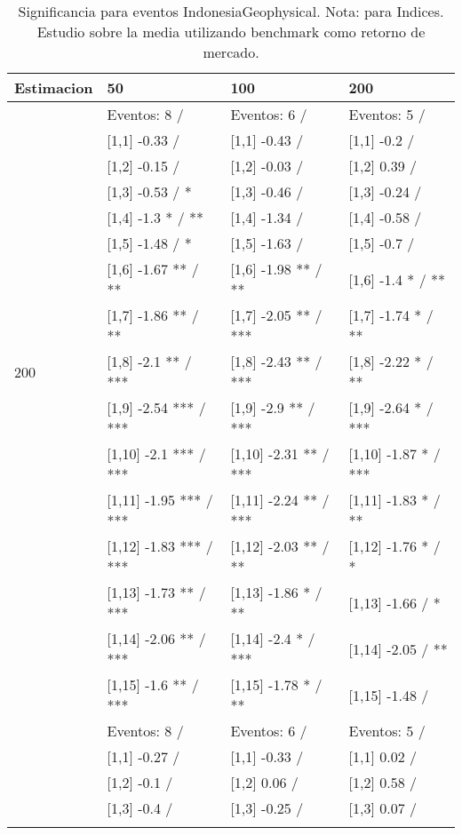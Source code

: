 \begin{table}

\caption{Significancia para eventos IndonesiaGeophysical. Nota: para Indices. Estudio sobre la media utilizando benchmark como retorno de mercado.}
\centering
\begin{tabular}[t]{llll}
\toprule
Estimacion & 50 & 100 & 200\\
\midrule
 & Eventos:  8 / & Eventos:  6 / & Eventos:  5 /\\
 & {}[1,1] -0.33  / & {}[1,1] -0.43  / & {}[1,1] -0.2  /\\
 & {}[1,2] -0.15  / & {}[1,2] -0.03  / & {}[1,2] 0.39  /\\
 & {}[1,3] -0.53  / * & {}[1,3] -0.46  / & {}[1,3] -0.24  /\\
 & {}[1,4] -1.3 * / ** & {}[1,4] -1.34  / & {}[1,4] -0.58  /\\
\addlinespace
 & {}[1,5] -1.48  / * & {}[1,5] -1.63  / & {}[1,5] -0.7  /\\
 & {}[1,6] -1.67 ** / ** & {}[1,6] -1.98 ** / ** & {}[1,6] -1.4 * / **\\
 & {}[1,7] -1.86 ** / ** & {}[1,7] -2.05 ** / *** & {}[1,7] -1.74 * / **\\
200 & {}[1,8] -2.1 ** / *** & {}[1,8] -2.43 ** / *** & {}[1,8] -2.22 * / **\\
 & {}[1,9] -2.54 *** / *** & {}[1,9] -2.9 ** / *** & {}[1,9] -2.64 * / ***\\
\addlinespace
 & {}[1,10] -2.1 *** / *** & {}[1,10] -2.31 ** / *** & {}[1,10] -1.87 * / ***\\
 & {}[1,11] -1.95 *** / *** & {}[1,11] -2.24 ** / *** & {}[1,11] -1.83 * / **\\
 & {}[1,12] -1.83 *** / *** & {}[1,12] -2.03 ** / ** & {}[1,12] -1.76 * / *\\
 & {}[1,13] -1.73 ** / *** & {}[1,13] -1.86 * / ** & {}[1,13] -1.66  / *\\
 & {}[1,14] -2.06 ** / *** & {}[1,14] -2.4 * / *** & {}[1,14] -2.05  / **\\
\addlinespace
 & {}[1,15] -1.6 ** / *** & {}[1,15] -1.78 * / ** & {}[1,15] -1.48  /\\
 & Eventos:  8 / & Eventos:  6 / & Eventos:  5 /\\
 & {}[1,1] -0.27  / & {}[1,1] -0.33  / & {}[1,1] 0.02  /\\
 & {}[1,2] -0.1  / & {}[1,2] 0.06  / & {}[1,2] 0.58  /\\
 & {}[1,3] -0.4  / & {}[1,3] -0.25  / & {}[1,3] 0.07  /\\
\addlinespace

\end{tabular}
\end{table}
